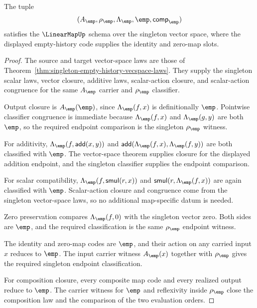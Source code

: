 \begin{theorem}
\label{thm:singleton-empty-history-linearmap-laws}
The tuple
$$
(A_{\emp},\rho_{\emp},\Lambda_{\emp},\emp,\mathsf{comp}_{\emp})
$$
satisfies the $\LinearMapUp$ schema over the singleton vector space, where the
displayed empty-history code supplies the identity and zero-map slots.
\end{theorem}
\begin{proof}
The source and target vector-space laws are those of
Theorem~\ref{thm:singleton-empty-history-vecspace-laws}. They supply the
singleton scalar laws, vector closure, additive laws, scalar-action closure,
and scalar-action congruence for the same $A_{\emp}$ carrier and
$\rho_{\emp}$ classifier.

Output closure is $A_{\emp}(\emp)$, since
$\Lambda_{\emp}(f,x)$ is definitionally $\emp$. Pointwise classifier
congruence is immediate because
$\Lambda_{\emp}(f,x)$ and $\Lambda_{\emp}(g,y)$ are both $\emp$, so the
required endpoint comparison is the singleton $\rho_{\emp}$ witness.

For additivity,
$\Lambda_{\emp}(f,\mathsf{add}(x,y))$ and
$\mathsf{add}(\Lambda_{\emp}(f,x),\Lambda_{\emp}(f,y))$ are both classified
with $\emp$. The vector-space theorem supplies closure for the displayed
addition endpoint, and the singleton classifier supplies the endpoint
comparison.

For scalar compatibility,
$\Lambda_{\emp}(f,\mathsf{smul}(r,x))$ and
$\mathsf{smul}(r,\Lambda_{\emp}(f,x))$ are again classified with $\emp$.
Scalar-action closure and congruence come from the singleton vector-space
laws, so no additional map-specific datum is needed.

Zero preservation compares $\Lambda_{\emp}(f,0)$ with the singleton vector
zero. Both sides are $\emp$, and the required classification is the same
$\rho_{\emp}$ endpoint witness.

The identity and zero-map codes are $\emp$, and their action on any carried
input $x$ reduces to $\emp$. The input carrier witness $A_{\emp}(x)$ together
with $\rho_{\emp}$ gives the required singleton endpoint classification.

For composition closure, every composite map code and every realized output
reduce to $\emp$. The carrier witness for $\emp$ and reflexivity inside
$\rho_{\emp}$ close the composition law and the comparison of the two
evaluation orders.
\end{proof}

